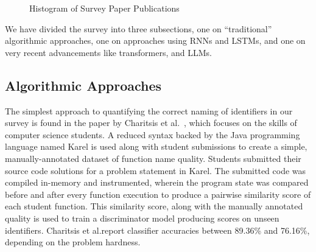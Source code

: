 \documentclass[conference]{IEEEtran}
\begin{document}
\begin{figure}[h!]
    \caption{Histogram of Survey Paper Publications}
    \label{fig:Histogram-of-Survey-Paper-Publications}
\end{figure}

We have divided the survey into three subsections, one on \enquote{traditional}
algorithmic approaches, one on approaches using \acp{RNN} and \acp{LSTM}, and one on very
recent advancements like transformers, and \acp{LLM}.

\subsection{Algorithmic Approaches}
\label{ssec:Algorithmic-Approaches}

The simplest approach to quantifying the correct naming of identifiers in our survey is
found in the paper by Charitsis et al.\@~\cite{Charitsis2021Assessing}, which focuses on
the skills of computer science students. A reduced syntax backed by the Java programming
language named Karel is used along with student submissions to create a simple,
manually-annotated dataset of function name quality. Students submitted their source code
solutions for a problem statement in Karel. The submitted code was compiled in-memory and
instrumented, wherein the program state was compared before and after every function
execution to produce a pairwise similarity score of each student function. This similarity
score, along with the manually annotated quality is used to train a discriminator model
producing scores on unseen identifiers. Charitsis et al.\@ report classifier accuracies
between 89.36\% and 76.16\%, depending on the problem hardness.
\end{document}

